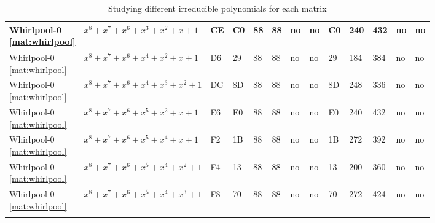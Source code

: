 \begin{tiny}
\begin{longtable}{|l|l|l|l|l|l|l|l|l|l|l|l|l|}
\shortstack{Whirlpool-0 \\ \eqref{mat:whirlpool}} & $x^8 + x^7 + x^6 + x^3 + x^2 + x + 1$ & CE & C0 & 88 & 88 & no & no & C0 & 240 & 432 & no & no \\ \hline
\shortstack{Whirlpool-0 \\ \eqref{mat:whirlpool}} & $x^8 + x^7 + x^6 + x^4 + x^2 + x + 1$ & D6 & 29 & 88 & 88 & no & no & 29 & 184 & 384 & no & no \\ \hline
\shortstack{Whirlpool-0 \\ \eqref{mat:whirlpool}} & $x^8 + x^7 + x^6 + x^4 + x^3 + x^2 + 1$ & DC & 8D & 88 & 88 & no & no & 8D & 248 & 336 & no & no \\ \hline
\shortstack{Whirlpool-0 \\ \eqref{mat:whirlpool}} & $x^8 + x^7 + x^6 + x^5 + x^2 + x + 1$ & E6 & E0 & 88 & 88 & no & no & E0 & 240 & 432 & no & no \\ \hline
\shortstack{Whirlpool-0 \\ \eqref{mat:whirlpool}} & $x^8 + x^7 + x^6 + x^5 + x^4 + x + 1$ & F2 & 1B & 88 & 88 & no & no & 1B & 272 & 392 & no & no \\ \hline
\shortstack{Whirlpool-0 \\ \eqref{mat:whirlpool}} & $x^8 + x^7 + x^6 + x^5 + x^4 + x^2 + 1$ & F4 & 13 & 88 & 88 & no & no & 13 & 200 & 360 & no & no \\ \hline
\shortstack{Whirlpool-0 \\ \eqref{mat:whirlpool}} & $x^8 + x^7 + x^6 + x^5 + x^4 + x^3 + 1$ & F8 & 70 & 88 & 88 & no & no & 70 & 272 & 424 & no & no \\ \hline
\caption{Studying different irreducible polynomials for each matrix}
\label{tbl:different-poly}\\
\end{longtable}
\end{tiny}
